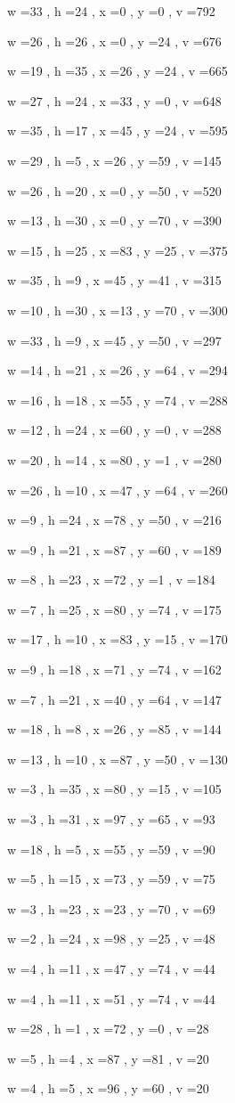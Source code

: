\documentclass[11pt]{article}
\begin{document}
w =33 , h =24 , x =0 , y =0 , v =792
\par
w =26 , h =26 , x =0 , y =24 , v =676
\par
w =19 , h =35 , x =26 , y =24 , v =665
\par
w =27 , h =24 , x =33 , y =0 , v =648
\par
w =35 , h =17 , x =45 , y =24 , v =595
\par
w =29 , h =5 , x =26 , y =59 , v =145
\par
w =26 , h =20 , x =0 , y =50 , v =520
\par
w =13 , h =30 , x =0 , y =70 , v =390
\par
w =15 , h =25 , x =83 , y =25 , v =375
\par
w =35 , h =9 , x =45 , y =41 , v =315
\par
w =10 , h =30 , x =13 , y =70 , v =300
\par
w =33 , h =9 , x =45 , y =50 , v =297
\par
w =14 , h =21 , x =26 , y =64 , v =294
\par
w =16 , h =18 , x =55 , y =74 , v =288
\par
w =12 , h =24 , x =60 , y =0 , v =288
\par
w =20 , h =14 , x =80 , y =1 , v =280
\par
w =26 , h =10 , x =47 , y =64 , v =260
\par
w =9 , h =24 , x =78 , y =50 , v =216
\par
w =9 , h =21 , x =87 , y =60 , v =189
\par
w =8 , h =23 , x =72 , y =1 , v =184
\par
w =7 , h =25 , x =80 , y =74 , v =175
\par
w =17 , h =10 , x =83 , y =15 , v =170
\par
w =9 , h =18 , x =71 , y =74 , v =162
\par
w =7 , h =21 , x =40 , y =64 , v =147
\par
w =18 , h =8 , x =26 , y =85 , v =144
\par
w =13 , h =10 , x =87 , y =50 , v =130
\par
w =3 , h =35 , x =80 , y =15 , v =105
\par
w =3 , h =31 , x =97 , y =65 , v =93
\par
w =18 , h =5 , x =55 , y =59 , v =90
\par
w =5 , h =15 , x =73 , y =59 , v =75
\par
w =3 , h =23 , x =23 , y =70 , v =69
\par
w =2 , h =24 , x =98 , y =25 , v =48
\par
w =4 , h =11 , x =47 , y =74 , v =44
\par
w =4 , h =11 , x =51 , y =74 , v =44
\par
w =28 , h =1 , x =72 , y =0 , v =28
\par
w =5 , h =4 , x =87 , y =81 , v =20
\par
w =4 , h =5 , x =96 , y =60 , v =20
\par
\newpage
\end{document}
